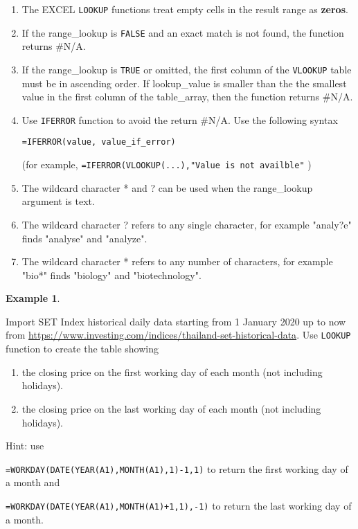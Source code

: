\documentclass[
]{article}
\theoremstyle{definition}
\theoremstyle{definition}
\newtheorem{example}{Example}[section]
\theoremstyle{definition}
\theoremstyle{definition}
\theoremstyle{remark}
\begin{document}
\begin{enumerate}
\def\labelenumi{\arabic{enumi}.}
\item
  The EXCEL \texttt{LOOKUP} functions treat empty cells in the result range as
  \textbf{zeros}.
\item
  If the range\_lookup is \texttt{FALSE} and an exact match is not found, the
  function returns \#N/A.
\item
  If the range\_lookup is \texttt{TRUE} or omitted, the first column of the
  \texttt{VLOOKUP} table must be in ascending order. If lookup\_value is smaller
  than the the smallest value in the first column of the table\_array,
  then the function returns \#N/A.
\item
  Use \texttt{IFERROR} function to avoid the return \#N/A. Use the following
  syntax

  \texttt{=IFERROR(value,\ value\_if\_error)}

  (for example, \texttt{=IFERROR(VLOOKUP(...),"Value\ is\ not\ availble"} )
\item
  The wildcard character * and ? can be used when the range\_lookup
  argument is text.
\item
  The wildcard character ? refers to any single character, for example
  "analy?e" finds "analyse" and "analyze".
\item
  The wildcard character * refers to any number of characters, for
  example "bio*" finds "biology" and "biotechnology".
\end{enumerate}

\begin{example}
\protect\hypertarget{exm:unlabeled-div-9}{}\label{exm:unlabeled-div-9}

Import SET Index historical daily data starting from 1 January 2020 up
to now from
\url{https://www.investing.com/indices/thailand-set-historical-data}. Use
\texttt{LOOKUP} function to create the table showing

\begin{enumerate}
\def\labelenumi{\arabic{enumi}.}
\item
  the closing price on the first working day of each month (not
  including holidays).
\item
  the closing price on the last working day of each month (not
  including holidays).
\end{enumerate}

Hint: use

\texttt{=WORKDAY(DATE(YEAR(A1),MONTH(A1),1)-1,1)} to return the first working day
of a month and

\texttt{=WORKDAY(DATE(YEAR(A1),MONTH(A1)+1,1),-1)} to return the last working day
of a month.

\end{example}
\end{document}
